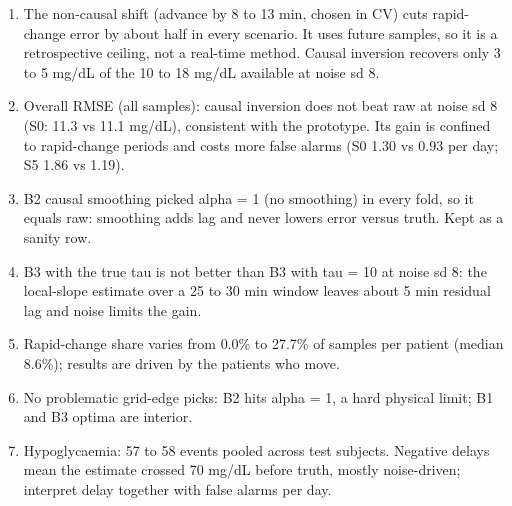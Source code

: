\documentclass[11pt,a4paper]{article}
\providecommand{\tightlist}{\setlength{\itemsep}{0pt}\setlength{\parskip}{0pt}}
\begin{document}
\begin{enumerate}
\def\labelenumi{\arabic{enumi}.}
\tightlist
\item
  The non-causal shift (advance by 8 to 13 min, chosen in CV) cuts
  rapid-change error by about half in every scenario. It uses future
  samples, so it is a retrospective ceiling, not a real-time method.
  Causal inversion recovers only 3 to 5 mg/dL of the 10 to 18 mg/dL
  available at noise sd 8.
\item
  Overall RMSE (all samples): causal inversion does not beat raw at
  noise sd 8 (S0: 11.3 vs 11.1 mg/dL), consistent with the prototype.
  Its gain is confined to rapid-change periods and costs more false
  alarms (S0 1.30 vs 0.93 per day; S5 1.86 vs 1.19).
\item
  B2 causal smoothing picked alpha = 1 (no smoothing) in every fold, so
  it equals raw: smoothing adds lag and never lowers error versus truth.
  Kept as a sanity row.
\item
  B3 with the true tau is not better than B3 with tau = 10 at noise sd
  8: the local-slope estimate over a 25 to 30 min window leaves about 5
  min residual lag and noise limits the gain.
\item
  Rapid-change share varies from 0.0\% to 27.7\% of samples per patient
  (median 8.6\%); results are driven by the patients who move.
\item
  No problematic grid-edge picks: B2 hits alpha = 1, a hard physical
  limit; B1 and B3 optima are interior.
\item
  Hypoglycaemia: 57 to 58 events pooled across test subjects. Negative
  delays mean the estimate crossed 70 mg/dL before truth, mostly
  noise-driven; interpret delay together with false alarms per day.
\end{enumerate}
\end{document}

